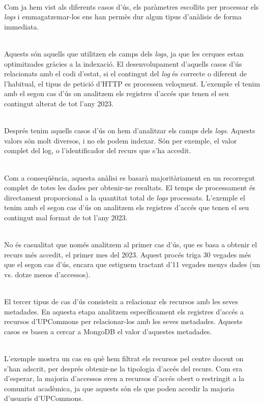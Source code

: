 \noindent \\
Com ja hem vist als diferents casos d'ús, els paràmetres escollits per processar els \textit{\gls{log}s} i emmagatzemar-los ens han permès dur algun tipus d'anàlisis de forma immediata.

\noindent \\
Aquests són aquells que utilitzen els camps dels \textit{\gls{log}s}, ja que les cerques estan optimitzades gràcies a la indexació.
El desenvolupament d'aquells casos d'ús relacionats amb el codi d'estat, si el contingut del \textit{\gls{log}} és correcte o diferent de l'habitual, el tipus de petició d'\gls{HTTP} es processen veloçment.
L'exemple el tenim amb el segon cas d'ús on analitzem els registres d'accés que tenen el seu contingut alterat de tot l'any 2023.

\noindent \\
Després tenim aquells casos d'ús on hem d'analitzar els camps dels \textit{\gls{log}s}.
Aquests valors són molt diversos, i no els podem indexar.
Són per exemple, el valor complet del log, o l'identificador del recurs que s'ha accedit.

\noindent \\
Com a conseqüència, aquesta anàlisi es basarà majoritàriament en un recorregut complet de totes les dades per obtenir-ne resultats.
El temps de processament és directament proporcional a la quantitat total de \textit{\gls{log}s} processats.
L'exemple el tenim amb el segon cas d'ús on analitzem els registres d'accés que tenen el seu contingut mal format de tot l'any 2023.

\noindent \\
No és casualitat que només analitzem al primer cas d'ús, que es basa a obtenir el recurs més accedit, el primer mes del 2023.
Aquest procés triga 30 vegades més que el segon cas d'ús, encara que estiguem tractant d'11 vegades menys dades (un vs. dotze mesos d'accessos).

\noindent \\
El tercer tipus de cas d'ús consisteix a relacionar els recursos amb les seves metadades.
En aquesta etapa analitzem específicament els registres d'accés a recursos d'\gls{UPCommons} per relacionar-los amb les seves metadades.
Aquests casos es basen a cercar a MongoDB el valor d'aquestes metadades.

\noindent \\
L'exemple mostra un cas en què hem filtrat els recursos pel centre docent on s'han adscrit, per després obtenir-ne la tipologia d'accés del recurs.
Com era d'esperar, la majoria d'accessos eren a recursos d'accés obert o restringit a la comunitat acadèmica, ja que aquests són els que poden accedir la majoria d'usuaris d'\gls{UPCommons}.

